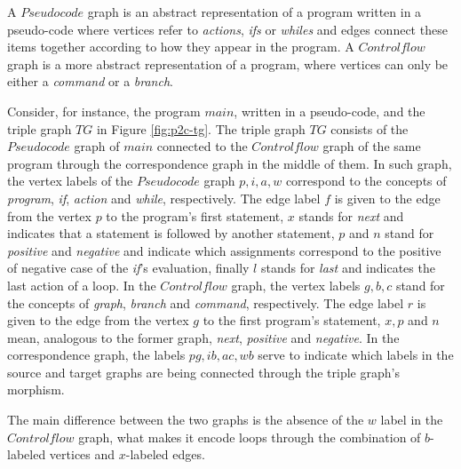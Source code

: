 \documentclass[a4paper,twoside]{article}
\begin{document}
\begin{example}
	\label{ex:pseudocode2controlflow}
	A $Pseudocode$ graph is an abstract representation of a program written in a pseudo-code where vertices refer to \textit{actions}, \textit{ifs} or \textit{whiles} and edges connect these items together according to how they appear in the program. A $Controlflow$ graph is a more abstract representation of a program, where vertices can only be either a \textit{command} or a \textit{branch}.
	
	Consider, for instance, the program $main$, written in a pseudo-code, and the triple graph $TG$ in Figure \ref{fig:p2c-tg}. The triple graph $TG$ consists of the $Pseudocode$ graph of $main$ connected to the $Controlflow$ graph of the same program through the correspondence graph in the middle of them. In such graph, the vertex labels of the $Pseudocode$ graph $p, i, a, w$ correspond to the concepts of \textit{program}, \textit{if}, \textit{action} and \textit{while}, respectively. The edge label $f$ is given to the edge from the vertex $p$ to the program's first statement, $x$ stands for \textit{next} and indicates that a statement is followed by another statement, $p$ and $n$ stand for \textit{positive} and \textit{negative} and indicate which assignments correspond to the positive of negative case of the \textit{if}'s evaluation, finally $l$ stands for \textit{last} and indicates the last action of a loop. In the $Controlflow$ graph, the vertex labels $g, b, c$ stand for the concepts of \textit{graph}, \textit{branch} and \textit{command}, respectively. The edge label $r$ is given to the edge from the vertex $g$ to the first program's statement, $x, p$ and $n$ mean, analogous to the former graph, \textit{next}, \textit{positive} and \textit{negative}. In the correspondence graph, the labels $pg, ib, ac, wb$ serve to indicate which labels in the source and target graphs are being connected through the triple graph's morphism.
	
	The main difference between the two graphs is the absence of the $w$ label in the $Controlflow$ graph, what makes it encode loops through the combination of $b$-labeled vertices and $x$-labeled edges.
	
	\begin{figure*}
		
		\caption{A program written in pseudo-code on the left and its correspondent triple graph with the $PseudoCode$ and the $ControlFlow$ graphs on the right}
		\label{fig:p2c-tg}
	\end{figure*}
	

\end{example}
\end{document}
